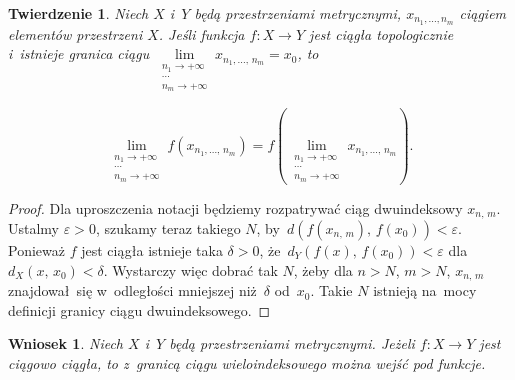 \documentclass[a4paper,11pt]{article}
\newtheorem{theorem}{Twierdzenie} %
\newtheorem{corollary}{Wniosek}
\begin{document}
\begin{theorem}

  Niech $X$ i~$Y$ będą przestrzeniami metrycznymi,
  $x_{ n_{ 1 }, \ldots, n_{ m } }$ ciągiem elementów przestrzeni $X$.
  Jeśli funkcja $f: X \to Y$ jest ciągła topologicznie i~istnieje
  granica ciągu
  $\lim\limits_{ \substack{ n_{ 1 } \to +\infty \\ \cdots \\ n_{ m } \to
      +\infty } } x_{ n_{ 1 }, \ldots, \, n_{ m } } = x_{ 0 }$, to

  \begin{equation}
    \label{RS-Vol-I-s01-11}
    \lim\limits_{ \substack{ n_{ 1 } \to +\infty \\ \cdots \\  n_{ m } \to +\infty } }
    f( x_{ n_{ 1 }, \ldots, \, n_{ m } } )
    = f( \lim\limits_{ \substack{ n_{ 1 } \to +\infty \\ \cdots \\ n_{ m } \to
        +\infty } } x_{ n_{ 1 }, \ldots, \, n_{ m } } ).
  \end{equation}

\end{theorem}



\begin{proof}

  Dla uproszczenia notacji będziemy rozpatrywać ciąg dwuindeksowy
  $x_{ n, \, m }$. Ustalmy $\varepsilon > 0$, szukamy teraz takiego $N$,
  by~$d( f( x_{ n, \, m } ),\, f( x_{ 0 } ) ) < \varepsilon$. Ponieważ $f$
  jest ciągła istnieje taka $\delta > 0$, \linebreak
  że~$d_{ Y }( f( x ),\, f( x_{ 0 } ) ) < \varepsilon$
  dla~$d_{ X }( x,\, x_{ 0 } ) < \delta$. Wystarczy więc dobrać tak $N$,
  żeby dla $n > N$, $m > N$, $x_{ n, \, m }$ znajdował~się
  w~odległości mniejszej niż~$\delta$ od~$x_{ 0 }$. Takie $N$ istnieją
  na~mocy definicji granicy ciągu dwuindeksowego.

\end{proof}





\begin{corollary}

  Niech $X$ i~$Y$ będą przestrzeniami metrycznymi. Jeżeli $f: X \to Y$
  jest ciągowo ciągła, to z~granicą ciągu wieloindeksowego można wejść
  pod funkcje.

\end{corollary}
\end{document}
